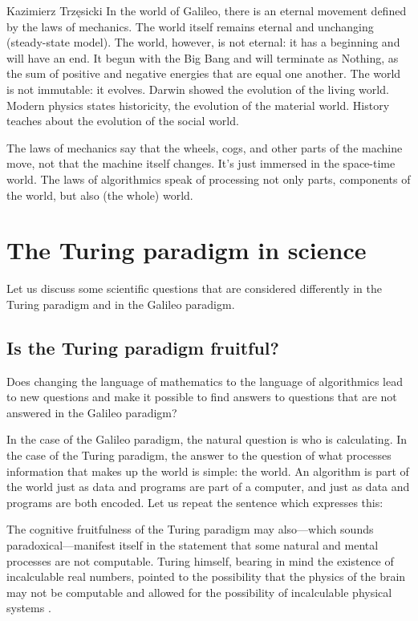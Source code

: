 \begin{artengenv}{Kazimierz Trzęsicki}
In the world of Galileo, there is an eternal movement defined by the laws of mechanics. The world itself remains eternal and unchanging (steady-state model). The world, however, is not eternal: it has a beginning and will have an end. It begun with the Big Bang and will terminate as Nothing, as the sum of positive and negative energies that are equal one another. The world is not immutable: it evolves. Darwin showed the evolution of the living world. Modern physics states historicity, the evolution of the material world. History teaches about the evolution of the social world.

The laws of mechanics say that the wheels, cogs, and other parts of the machine move, not that the machine itself changes. It's just immersed in the space-time world. The laws of algorithmics speak of processing not only parts, components of the world, but also (the whole) world.


\section{The Turing paradigm in science} Let us discuss some scientific questions that are considered differently in the Turing paradigm and in the Galileo paradigm.



\subsection{Is the Turing paradigm fruitful?} Does changing the language of mathematics to the language of algorithmics lead to new questions and make it possible to find answers to questions that are not answered in the Galileo paradigm?

In the case of the Galileo paradigm, the natural question is who is calculating. In the case of the Turing paradigm, the answer to the question of what processes information that makes up the world is simple: the world. An algorithm is part of the world just as data and programs are part of a computer, and just as data and programs are both encoded. Let us repeat the sentence which expresses this: 

The cognitive fruitfulness of the Turing paradigm may also---which sounds paradoxical---manifest itself in the statement that some natural and mental processes are not computable. Turing himself, bearing in mind the existence of incalculable real numbers, pointed to the possibility that the physics of the brain may not be computable and allowed for the possibility of incalculable physical systems \parencite[paragraph: ``The physical computability thesis'']{CopelandSprevakShagrir2017}.


\end{artengenv}
